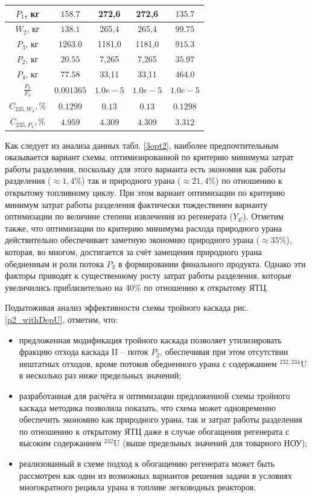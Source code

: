 \begin{table}
\begin{tabular}{|c|c|c|c|c|}
    $P_1$, кг  & $158.7$ & 272,6 & 272,6 & $135.7$\\ \hline
    $W_2$, кг  & $138.1$ & 265,4 & 265,4 & $99.75$\\ \hline
    $P_3$, кг  & $1263.0$ & 1181,0 & 1181,0 & $915.3$\\ \hline
    $P_2$, кг  & $20.55$ & 7,265 & 7,265 & $35.97$\\ \hline
    $P_4$, кг  & $77.58$ & 33,11 & 33,11 & $464.0$\\ \hline
    $\frac{P_{2}}{F_3}$  & $0.001365$ & $1.0e-5$ & $1.0e-5$ & $1.0e-5$\\ \hline
    $C_{235,W_{4}}, \%$ & $0.1299$ & $0.13$ & $0.13$ & $0.1298$\\ \hline
    $C_{235,P_{4}}, \%$ & $4.959$ & $4.309$ & $4.309$ & $3.312$\\ \hline
\end{tabular}
\end{table}

Как следует из анализа данных табл. \ref{3opt2}, наиболее предпочтительным оказывается вариант схемы, оптимизированной по критерию минимума затрат работы разделения, поскольку для этого варианта есть экономия как работы разделения ($\approx 1,4\%$) так и природного урана ($\approx 21,4\%$) по отношению к открытому топливному циклу. При этом вариант оптимизации по критерию минимум затрат работы разделения фактически тождественен варианту оптимизации по величине степени извлечения из регенерата ($Y_E$). Отметим также, что оптимизации по критерию минимума расхода природного урана действительно обеспечивает заметную экономию природного урана ($\approx 35\%$), которая, во многом, достигается за счёт замещения природного урана обедненным и роли потока $P_3$ в формировании финального продукта. Однако эти факторы приводят к существенному росту затрат работы разделения, которые увеличились приблизительно на 40\% по отношению к открытому ЯТЦ.

Подытоживая анализ эффективности схемы тройного каскада рис. \ref{p2_withDepU}, отметим, что:

\begin{itemize}
    \item предложенная модификация тройного каскада позволяет утилизировать фракцию отхода каскада II -- поток $P_2$, обеспечивая при этом отсутствии нештатных отходов, кроме потоков обедненного урана с содержанием $^{232,234}$U в несколько раз ниже предельных значений; 
    \item разработанная для расчёта и оптимизации предложенной схемы тройного каскада методика позволила показать, что схема может одновременно обеспечить экономию как природного урана, так и затрат работы разделения по отношению к открытому ЯТЦ даже в случае обогащения регенерата с высоким содержанием $^{232}$U (выше предельных значений для товарного НОУ); 
    \item реализованный в схеме подход к обогащению регенерата может быть рассмотрен как один из возможных вариантов решения задачи в условиях многократного рецикла урана в топливе легководных реакторов.
\end{itemize}

